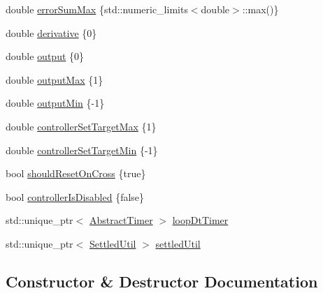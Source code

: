 \begin{DoxyCompactItemize}
\item 
double \mbox{\hyperlink{classokapi_1_1IterativePosPIDController_a5b6c38080cd4eb7a7a3bdbd3a926c546}{error\+Sum\+Max}} \{std\+::numeric\+\_\+limits$<$double$>$\+::max()\}
\item 
double \mbox{\hyperlink{classokapi_1_1IterativePosPIDController_a8d971804af5f429a91c71f6722e2f395}{derivative}} \{0\}
\item 
double \mbox{\hyperlink{classokapi_1_1IterativePosPIDController_a6cd04ec8b5112f71cc4c89e8ac795e41}{output}} \{0\}
\item 
double \mbox{\hyperlink{classokapi_1_1IterativePosPIDController_adfa78710b50ab0a1fe50236370e4eecd}{output\+Max}} \{1\}
\item 
double \mbox{\hyperlink{classokapi_1_1IterativePosPIDController_af283d92615f66697282d70b3298e16d5}{output\+Min}} \{-\/1\}
\item 
double \mbox{\hyperlink{classokapi_1_1IterativePosPIDController_a1522e92d11f219b6c6d3b857774dab9e}{controller\+Set\+Target\+Max}} \{1\}
\item 
double \mbox{\hyperlink{classokapi_1_1IterativePosPIDController_ac53c0e9e57b94cbc7d733fd14daa9821}{controller\+Set\+Target\+Min}} \{-\/1\}
\item 
bool \mbox{\hyperlink{classokapi_1_1IterativePosPIDController_af64cc9a0bca1738b49a3f9d6e84b010a}{should\+Reset\+On\+Cross}} \{true\}
\item 
bool \mbox{\hyperlink{classokapi_1_1IterativePosPIDController_a8e40c383cdba1a775dd73d366270cf83}{controller\+Is\+Disabled}} \{false\}
\item 
std\+::unique\+\_\+ptr$<$ \mbox{\hyperlink{classokapi_1_1AbstractTimer}{Abstract\+Timer}} $>$ \mbox{\hyperlink{classokapi_1_1IterativePosPIDController_aaddc06f74a9f601d4d1a4b6dba45bf73}{loop\+Dt\+Timer}}
\item 
std\+::unique\+\_\+ptr$<$ \mbox{\hyperlink{classokapi_1_1SettledUtil}{Settled\+Util}} $>$ \mbox{\hyperlink{classokapi_1_1IterativePosPIDController_ada52e35922bbe26a1fd464547800d56f}{settled\+Util}}
\end{DoxyCompactItemize}


\subsection{Constructor \& Destructor Documentation}
\mbox{\label{classokapi_1_1IterativePosPIDController_a2478d2d77267e78f3b8c0b1770569f1e}} 
